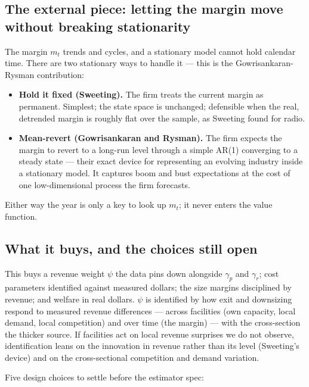 \documentclass[
  letterpaper,
  DIV=11,
  numbers=noendperiod]{scrartcl}
\providecommand{\tightlist}{%
  \setlength{\itemsep}{0pt}\setlength{\parskip}{0pt}}\usepackage{longtable,booktabs,array}
\begin{document}
\subsection{The external piece: letting the margin move without breaking
stationarity}\label{the-external-piece-letting-the-margin-move-without-breaking-stationarity}

The margin \(m_t\) trends and cycles, and a stationary model cannot hold
calendar time. There are two stationary ways to handle it --- this is
the Gowrisankaran-Rysman contribution:

\begin{itemize}
\tightlist
\item
  \textbf{Hold it fixed (Sweeting).} The firm treats the current margin
  as permanent. Simplest; the state space is unchanged; defensible when
  the real, detrended margin is roughly flat over the sample, as
  Sweeting found for radio.
\item
  \textbf{Mean-revert (Gowrisankaran and Rysman).} The firm expects the
  margin to revert to a long-run level through a simple AR(1) converging
  to a steady state --- their exact device for representing an evolving
  industry inside a stationary model. It captures boom and bust
  expectations at the cost of one low-dimensional process the firm
  forecasts.
\end{itemize}

Either way the year is only a key to look up \(m_t\); it never enters
the value function.

\subsection{What it buys, and the choices still
open}\label{what-it-buys-and-the-choices-still-open}

This buys a revenue weight \(\psi\) the data pins down alongside
\(\gamma_p\) and \(\gamma_r\); cost parameters identified against
measured dollars; the size margins disciplined by revenue; and welfare
in real dollars. \(\psi\) is identified by how exit and downsizing
respond to measured revenue differences --- across facilities (own
capacity, local demand, local competition) and over time (the margin)
--- with the cross-section the thicker source. If facilities act on
local revenue surprises we do not observe, identification leans on the
innovation in revenue rather than its level (Sweeting's device) and on
the cross-sectional competition and demand variation.

Five design choices to settle before the estimator spec:
\end{document}
